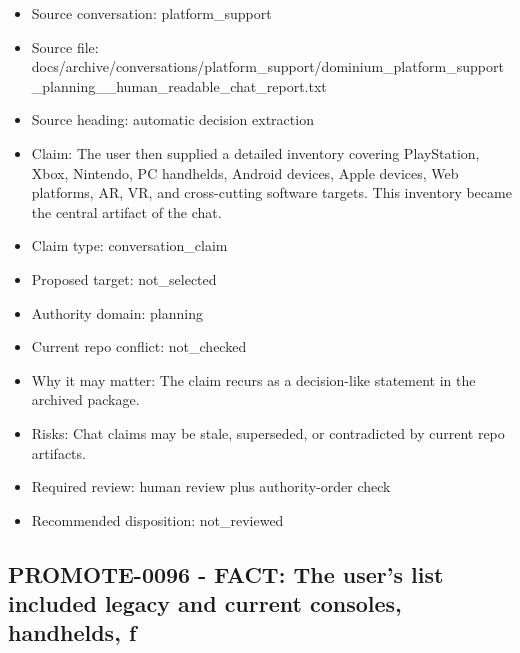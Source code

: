 \documentclass[11pt,a4paper]{report}
\begin{document}
\begin{itemize}
\item Source conversation: platform\_support
\item Source file: docs/archive/conversations/platform\_support/dominium\_platform\_support\_planning\_\_human\_readable\_chat\_report.txt
\item Source heading: automatic decision extraction
\item Claim: The user then supplied a detailed inventory covering PlayStation, Xbox, Nintendo, PC handhelds, Android devices, Apple devices, Web platforms, AR, VR, and cross-cutting software targets. This inventory became the central artifact of the chat.
\item Claim type: conversation\_claim
\item Proposed target: not\_selected
\item Authority domain: planning
\item Current repo conflict: not\_checked
\item Why it may matter: The claim recurs as a decision-like statement in the archived package.
\item Risks: Chat claims may be stale, superseded, or contradicted by current repo artifacts.
\item Required review: human review plus authority-order check
\item Recommended disposition: not\_reviewed
\end{itemize}

\subsection{PROMOTE-0096 - FACT: The user's list included legacy and current consoles, handhelds, f}
\end{document}
